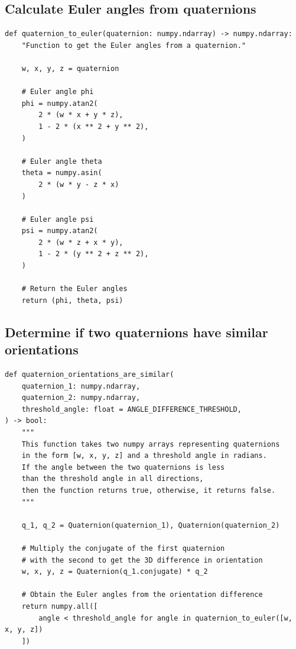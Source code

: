 \documentclass[12pt]{report}
\begin{document}
\subsection{Calculate Euler angles from quaternions}
\label{sec:orgeda64c9}
\begin{verbatim}
def quaternion_to_euler(quaternion: numpy.ndarray) -> numpy.ndarray:
    "Function to get the Euler angles from a quaternion."

    w, x, y, z = quaternion

    # Euler angle phi
    phi = numpy.atan2(
        2 * (w * x + y * z),
        1 - 2 * (x ** 2 + y ** 2),
    )

    # Euler angle theta
    theta = numpy.asin(
        2 * (w * y - z * x)
    )

    # Euler angle psi
    psi = numpy.atan2(
        2 * (w * z + x * y),
        1 - 2 * (y ** 2 + z ** 2),
    )

    # Return the Euler angles
    return (phi, theta, psi)
\end{verbatim}
\subsection{Determine if two quaternions have similar orientations}
\label{sec:orgf53e43c}
\begin{verbatim}
def quaternion_orientations_are_similar(
    quaternion_1: numpy.ndarray,
    quaternion_2: numpy.ndarray,
    threshold_angle: float = ANGLE_DIFFERENCE_THRESHOLD,
) -> bool:
    """
    This function takes two numpy arrays representing quaternions
    in the form [w, x, y, z] and a threshold angle in radians.
    If the angle between the two quaternions is less
    than the threshold angle in all directions,
    then the function returns true, otherwise, it returns false.
    """

    q_1, q_2 = Quaternion(quaternion_1), Quaternion(quaternion_2)

    # Multiply the conjugate of the first quaternion
    # with the second to get the 3D difference in orientation
    w, x, y, z = Quaternion(q_1.conjugate) * q_2

    # Obtain the Euler angles from the orientation difference
    return numpy.all([
        angle < threshold_angle for angle in quaternion_to_euler([w, x, y, z])
    ])
\end{verbatim}
\end{document}
